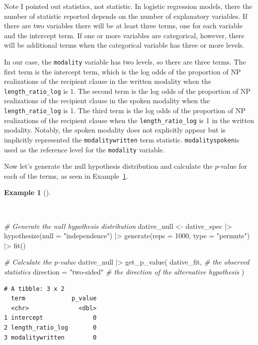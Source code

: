 \documentclass[
  letterpaper,
]{latex/krantz}
\newenvironment{Shaded}{\begin{snugshade}}{\end{snugshade}}
\newcommand{\AttributeTok}[1]{\textcolor[rgb]{0.00,0.00,0.00}{#1}}
\newcommand{\CommentTok}[1]{\textcolor[rgb]{0.00,0.00,0.00}{\textit{#1}}}
\newcommand{\DecValTok}[1]{\textcolor[rgb]{0.00,0.00,0.00}{#1}}
\newcommand{\FunctionTok}[1]{\textcolor[rgb]{0.00,0.00,0.00}{#1}}
\newcommand{\NormalTok}[1]{\textcolor[rgb]{0.00,0.00,0.00}{#1}}
\newcommand{\OtherTok}[1]{\textcolor[rgb]{0.00,0.00,0.00}{#1}}
\newcommand{\SpecialCharTok}[1]{\textcolor[rgb]{0.00,0.00,0.00}{#1}}
\newcommand{\StringTok}[1]{\textcolor[rgb]{0.00,0.00,0.00}{#1}}
\theoremstyle{definition}
\newtheorem{example}{Example}[chapter]
\theoremstyle{remark}
\begin{document}
Note I pointed out statistics, not statistic. In logistic regression
models, there the number of statistic reported depends on the number of
explanatory variables. If there are two variables there will be at least
three terms, one for each variable and the intercept term. If one or
more variables are categorical, however, there will be additional terms
when the categorical variable has three or more levels.

In our case, the \texttt{modality} variable has two levels, so there are
three terms. The first term is the intercept term, which is the log odds
of the proportion of NP realizations of the recipient clause in the
written modality when the \texttt{length\_ratio\_log} is 1. The second
term is the log odds of the proportion of NP realizations of the
recipient clause in the spoken modality when the
\texttt{length\_ratio\_log} is 1. The third term is the log odds of the
proportion of NP realizations of the recipient clause when the
\texttt{length\_ratio\_log} is 1 in the written modality. Notably, the
spoken modality does not explicitly appear but is implicitly represented
the \texttt{modalitywritten} term statistic. \texttt{modalityspoken}is
used as the reference level for the \texttt{modality} variable.

Now let's generate the null hypothesis distribution and calculate the
\(p\)-value for each of the terms, as seen in
Example~\ref{exm-infer-cat-null-hypothesis-logistic-regression}.

\begin{example}[]\protect\hypertarget{exm-infer-cat-null-hypothesis-logistic-regression}{}\label{exm-infer-cat-null-hypothesis-logistic-regression}

~

\begin{Shaded}
\begin{Highlighting}[]
\CommentTok{\# Generate the null hypothesis distribution}
\NormalTok{dative\_null }\OtherTok{\textless{}{-}}
\NormalTok{  dative\_spec }\SpecialCharTok{|\textgreater{}}
  \FunctionTok{hypothesize}\NormalTok{(}\AttributeTok{null =} \StringTok{"independence"}\NormalTok{) }\SpecialCharTok{|\textgreater{}}
  \FunctionTok{generate}\NormalTok{(}\AttributeTok{reps =} \DecValTok{1000}\NormalTok{, }\AttributeTok{type =} \StringTok{"permute"}\NormalTok{) }\SpecialCharTok{|\textgreater{}}
  \FunctionTok{fit}\NormalTok{()}

\CommentTok{\# Calculate the $p${-}value}
\NormalTok{dative\_null }\SpecialCharTok{|\textgreater{}}
  \FunctionTok{get\_p\_value}\NormalTok{(}
\NormalTok{    dative\_fit, }\CommentTok{\# the observed statistics}
    \AttributeTok{direction =} \StringTok{"two{-}sided"} \CommentTok{\# the direction of the alternative hypothesis}
\NormalTok{  )}
\end{Highlighting}
\end{Shaded}

\begin{verbatim}
# A tibble: 3 x 2
  term             p_value
  <chr>              <dbl>
1 intercept              0
2 length_ratio_log       0
3 modalitywritten        0
\end{verbatim}

\end{example}
\end{document}
